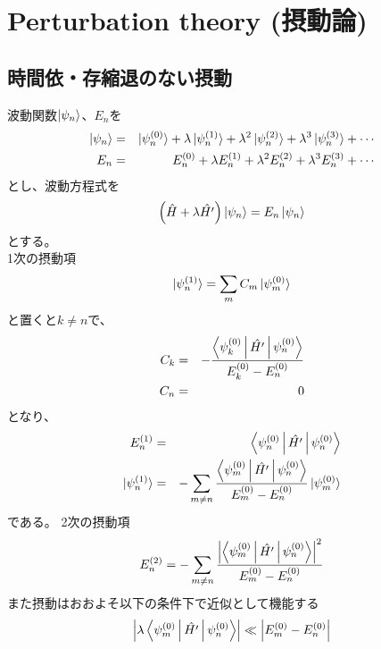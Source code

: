%
%
%
%
%
\section{Perturbation theory (摂動論)}


\subsection{時間依・存縮退のない摂動}

波動関数$ \ket{ \psi_n } $、$ E_n $を
\begin{eqnarray*}
\ket{ \psi_n }  & = & \ket{ \psi_n^{(0)} } + \lambda \ket{ \psi_n^{(1)} } + \lambda^2 \ket{ \psi_n^{(2)} } + \lambda^3 \ket{ \psi_n^{(3)} } + \cdots\\
E_n         & = & E_n^{(0)} + \lambda E_n^{(1)} + \lambda^2 E_n^{(2)} + \lambda^3 E_n^{(3)} + \cdots\\
\end{eqnarray*}
とし、波動方程式を
\[ \left( \hat{H} + \lambda \hat{H'} \right) \ket{ \psi_n } = E_n \ket{\psi_n} \]
とする。\\
1次の摂動項
\[ \ket{\psi_n^{(1)}} = \sum_m C_m \ket{\psi_m^{(0)}} \]
と置くと$ k \not= n $で、
\begin{eqnarray*}
C_k & = & -\frac{ \Braket{ \psi_k^{(0)} | \hat{H'} | \psi_n^{(0)} } }{ E_k^{(0)} - E_n^{(0)} } \\
C_n & = & 0 \\
\end{eqnarray*}
となり、
\begin{eqnarray*}
E_n^{(1)}   & = & \Braket{ \psi_n^{(0)} | \hat{H'} | \psi_n^{(0)} } \\
\ket{ \psi_n^{(1)}} & = & -\sum_{m\not= n} \frac{ \Braket{ \psi_m^{(0)} | \hat{H'} | \psi_n^{(0)} }}{ E_m^{(0)} - E_n^{(0)} } \ket{ \psi_m^{(0)} } \\
\end{eqnarray*}
である。
2次の摂動項
\[ E_n^{(2)} = -\sum_{m \not= n}\frac{ {\left| \Braket{\psi_m^{(0)} | \hat{H'} | \psi_n^{(0)} } \right|}^2 }{ E_m^{(0)} - E_n^{(0)} } \]
また摂動はおおよそ以下の条件下で近似として機能する
\[ \left| \lambda \Braket{ \psi_m^{(0)} | \hat{H'} | \psi_n^{(0)} } \right| \ll \left| E_m^{(0)} - E_n^{(0)} \right| \]
